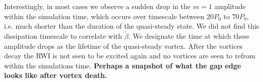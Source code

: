 Interestingly, in most cases we observe a sudden drop in 
the $m=1$ amplitude within the simulation time, which occurs over
timescale between $20P_0$ to $70P_0$, i.e. much shorter than the duration of the
quasi-steady state. We did not find this dissipation timescale to
correlate with $\tilde\beta$. %
We designate the time at which these amplitude drops as the lifetime 
of the quasi-steady vortex. After the vortices decay the RWI is 
not seen to be excited again and no vortices are seen to refrom within the
simulations time. 
{\bf Perhaps a snapshot of what the gap edge looks like after vortex death.
}

